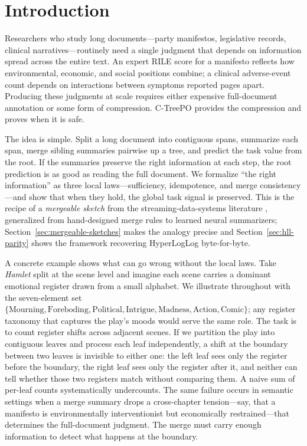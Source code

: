 \section{Introduction}\label{sec:introduction}

Researchers who study long documents---party manifestos, legislative records, clinical narratives---routinely need a single judgment that depends on information spread across the entire text. An expert RILE score for a manifesto reflects how environmental, economic, and social positions combine; a clinical adverse-event count depends on interactions between symptoms reported pages apart. Producing these judgments at scale requires either expensive full-document annotation or some form of compression. C-TreePO provides the compression and proves when it is safe.

The idea is simple. Split a long document into contiguous spans, summarize each span, merge sibling summaries pairwise up a tree, and predict the task value from the root. If the summaries preserve the right information at each step, the root prediction is as good as reading the full document. We formalize ``the right information'' as three local laws---sufficiency, idempotence, and merge consistency---and show that when they hold, the global task signal is preserved. This is the recipe of a \emph{mergeable sketch} from the streaming-data-systems literature \citep{Agarwal2013MergeableTODS}, generalized from hand-designed merge rules to learned neural summarizers; Section~\ref{sec:mergeable-sketches} makes the analogy precise and Section~\ref{sec:hll-parity} shows the framework recovering HyperLogLog byte-for-byte.

A concrete example shows what can go wrong without the local laws. Take \emph{Hamlet} split at the scene level and imagine each scene carries a dominant emotional register drawn from a small alphabet. We illustrate throughout with the seven-element set $\{\text{Mourning}, \text{Foreboding}, \text{Political}, \text{Intrigue}, \text{Madness}, \text{Action}, \text{Comic}\}$; any register taxonomy that captures the play's moods would serve the same role. The task is to count register shifts across adjacent scenes. If we partition the play into contiguous leaves and process each leaf independently, a shift at the boundary between two leaves is invisible to either one: the left leaf sees only the register before the boundary, the right leaf sees only the register after it, and neither can tell whether those two registers match without comparing them. A naive sum of per-leaf counts systematically undercounts. The same failure occurs in semantic settings when a merge summary drops a cross-chapter tension---say, that a manifesto is environmentally interventionist but economically restrained---that determines the full-document judgment. The merge must carry enough information to detect what happens at the boundary.

